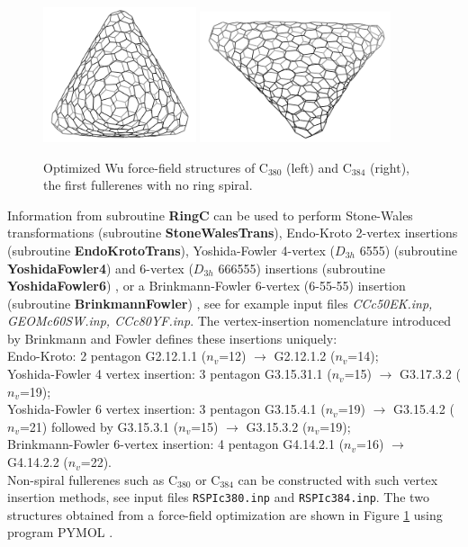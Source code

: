 \documentclass[article,a4paper,twoside]{memoir}
\newcommand{\C}[1]{\ensuremath{\mathrm{C}_{#1}}}
\newcommand{\filename}[1]{\texttt{#1}}
\newcommand{\funname}[1]{{\color{blue}\textbf{#1}}}
\begin{document}
 \begin{figure}[htbp]
   	\centering
  	\includegraphics[width=0.4\textwidth]{C380.png}
	\includegraphics[width=0.5\textwidth]{C384.png}
    \caption{Optimized Wu force-field structures of \C{380} (left) and \C{384} (right), the first fullerenes with no ring spiral.}
	\label{pic:C380andC384}
 \end{figure}

Information from subroutine \funname{RingC} can be used to perform Stone-Wales transformations \cite{Stone86}
(subroutine \funname{StoneWalesTrans}), Endo-Kroto 2-vertex insertions \cite{Endo92} (subroutine \funname{EndoKrotoTrans}),
Yoshida-Fowler 4-vertex ($D_{3h}$ 6555) (subroutine \funname{YoshidaFowler4}) and 6-vertex ($D_{3h}$ 666555)
insertions (subroutine \funname{YoshidaFowler6}) \cite{Yoshida97}, or a Brinkmann-Fowler 6-vertex (6-55-55) insertion 
(subroutine \funname{BrinkmannFowler}) \cite{BrinkmannFowler03}, see for example input files \textit{CCc50EK.inp, GEOMc60SW.inp, CCc80YF.inp}.
The vertex-insertion nomenclature introduced by Brinkmann and Fowler \cite{BrinkmannFowler03} defines these insertions uniquely:\\
Endo-Kroto: 2 pentagon G2.12.1.1 ($n_v$=12) $\rightarrow$ G2.12.1.2 ($n_v$=14);\\ 
Yoshida-Fowler 4 vertex insertion: 3 pentagon G3.15.31.1 ($n_v$=15) $\rightarrow$ G3.17.3.2 ($n_v$=19);\\
Yoshida-Fowler 6 vertex insertion: 3 pentagon G3.15.4.1 ($n_v$=19) $\rightarrow$ G3.15.4.2 ($n_v$=21) 
followed by G3.15.3.1 ($n_v$=15) $\rightarrow$ G3.15.3.2 ($n_v$=19);\\
Brinkmann-Fowler 6-vertex insertion: 4 pentagon G4.14.2.1 ($n_v$=16) $\rightarrow$ G4.14.2.2 ($n_v$=22).\\
Non-spiral fullerenes such as  \C{380} or  \C{384} can be constructed with such vertex insertion methods, see input files \filename{RSPIc380.inp} 
and \filename{RSPIc384.inp}. The two structures obtained from a force-field optimization are shown in Figure \ref{pic:C380andC384} using program PYMOL \cite{Pymol}.
\end{document}
